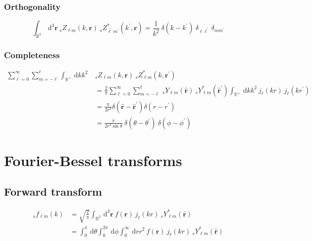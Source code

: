 \documentclass[a4paper,11pt]{article}
\newcommand{\realsnn}{\ensuremath{{\mathbb{R}^{+}}}}
\newcommand{\ball}{\ensuremath{{\mathbb{B}^3}}}
\newcommand{\dx}{\ensuremath{\mathrm{\,d}}}
\newcommand{\rvec}{{\boldsymbol{r}}}
\newcommand{\rang}{{\boldsymbol{\hat{r}}}}
\newcommand{\rlen}{{r}}
\begin{document}
\subsubsection{Orthogonality}

\begin{equation}
  \int_\ball \dx^3 \rvec \:
  {}_s Z_{\ell m}(k, \rvec) \:
  {}_s Z_{\ell^\prime m^\prime}^\ast(k^\prime, \rvec)   
   = 
  \frac{1}{k^2} \:
  \delta(k-k^\prime) \:
  \delta_{\ell \ell^\prime} \:
  \delta_{m m^\prime}   
\end{equation}


\subsubsection{Completeness}

\begin{align}  
  \sum_{\ell=0}^\infty \sum_{m=-\ell}^{\ell}
  \int_{\realsnn} \dx k k^2 \:
  & {}_s Z_{\ell m}(k, \rvec) \:
  {}_s Z_{\ell m}^\ast(k, \rvec^\prime) \\ 
  & =   
  \frac{2}{\pi} \sum_{\ell=0}^\infty \sum_{m=-\ell}^{\ell} \:
  {}_s Y_{\ell m}(\rang) \:
  {}_s Y_{\ell m}^\ast(\rang^\prime) 
  \int_{\realsnn} \dx k k^2 \: j_\ell(k \rlen) \: j_\ell(k \rlen^\prime) \\
  & = 
  \frac{\pi}{2\rlen^2}
  \delta(\rang-\rang^\prime)
  \delta(\rlen-\rlen^\prime)\\
  & = 
  \frac{\pi}{2\rlen^2\sin\theta} \:
  \delta(\theta-\theta^\prime) \:
  \delta(\phi-\phi^\prime)
\end{align}



\newpage
\section{Fourier-Bessel transforms}

\subsection{Forward transform}

\begin{align}
  {}_s f_{\ell m}(k) 
  & = 
  \sqrt{\frac{2}{\pi}} 
  \int_{\ball} \dx ^3 \rvec \:
  f(\rvec) \:
  j_\ell(k\rlen) \:
  {}_s Y_{\ell m}^\ast(\rang) \\
  & =  
  \int_0^{\pi}\dx \theta 
  \int_0^{2\pi} \dx \phi
  \int_0^\infty \dx \rlen 
  \rlen^2 \:
  f(\rvec) \:
  j_\ell(k\rlen) \:
  {}_s Y_{\ell m}^\ast(\rang) 
\end{align}
\end{document}
